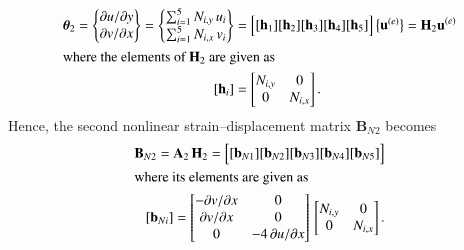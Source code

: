 \begin{subequations}
	\begin{align}
		\boldsymbol{\theta}_2 =  \begin{Bmatrix}
			\partial u / \partial y\\
			\partial v / \partial x
		\end{Bmatrix}
		= \begin{Bmatrix}
			\sum\nolimits_{i=1}^5 N_{i,y} \, u_i\\
			\sum\nolimits_{i=1}^5 N_{i,x} \, v_i
		\end{Bmatrix} 
		& = \begin{bmatrix}
			[\mathbf{h}_1] [\mathbf{h}_2] [\mathbf{h}_3] [\mathbf{h}_4] [\mathbf{h}_5] 
		\end{bmatrix} \bigl\{ \begin{matrix} \mathbf{u}^{(e)} \end{matrix} \bigr\}
		= \mathbf{H}_2  \mathbf{u}^{(e)}  \\
		\intertext{where the elements of $\mathbf{H}_2$ are given as}
		[\mathbf{h}_i] & = \begin{bmatrix}
			N_{i,y} &  0  \\
			0 & N_{i,x}  \end{bmatrix}.
	\end{align}
\end{subequations}
\normalsize
Hence, the second nonlinear strain--displacement matrix $\mathbf{B}_{N2}$ becomes
\begin{subequations}
	\begin{align}
		\mathbf{B}_{N2} = \mathbf{A}_2 \, \mathbf{H}_2 = \begin{bmatrix}
			[\mathbf{b}_{N1}] [\mathbf{b}_{N2}] [\mathbf{b}_{N3}] [\mathbf{b}_{N4}] [\mathbf{b}_{N5}] 
		\end{bmatrix}  \\
		\intertext{where its elements are given as}
		[\mathbf{b}_{Ni}] = \begin{bmatrix}
			- \partial v / \partial x &  0 \\
			\partial v / \partial x &  0 \\
			0 & -4 \, \partial u / \partial x  \end{bmatrix} \, \begin{bmatrix}
			N_{i,y} &  0  \\
			0 & N_{i,x}  \end{bmatrix}.
	\end{align}
\end{subequations}



